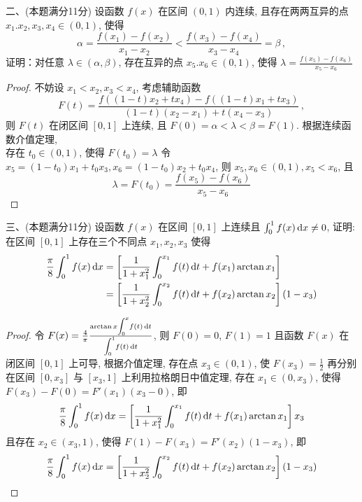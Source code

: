 \documentclass[11pt,twoside]{article} %
\begin{document}
\newpage
二、\;\;(本题满分11分)\;
设函数 $f(x)$ 在区间 $(0,1)$ 内连续, 且存在两两互异的点 $x_1.x_2,x_3,x_4\in(0,1)$, 使得
\[\alpha=\frac{f(x_1)-f(x_2)}{x_1-x_2}<\frac{f(x_3)-f(x_4)}{x_3-x_4}=\beta\,,\]
证明：对任意 $\lambda\in(\alpha,\beta)$, 存在互异的点 $x_5.x_6\in(0,1)$, 使得 $\lambda=\frac{f(x_5)-f(x_6)}{x_5-x_6}$
\begin{proof} 
不妨设 $x_1<x_2,x_3<x_4$, 考虑辅助函数
\[F(t)=\frac{f((1-t)x_2+tx_4)-f((1-t)x_1+tx_3)}{(1-t)(x_2-x_1)+t(x_4-x_3)}\,,\]
则 $F(t)$ 在闭区间 $[0,1]$ 上连续, 且 $F(0)=\alpha<\lambda<\beta=F(1)$. 根据连续函数介值定理,\\
存在 $t_0\in(0,1)$, 使得 $F(t_0)=\lambda$
令 $x_5=(1-t_0)x_1+t_0x_3,x_6=(1-t_0)x_2+t_0x_4$, 则 $x_5,x_6\in(0,1),x_5<x_6$, 且
\[\lambda=F(t_0)=\frac{f(x_5)-f(x_6)}{x_5-x_6}\]
\qedhere\end{proof}


三、(本题满分11分)\;
设函数 $f(x)$ 在区间 $[0,1]$ 上连续且 $\int_0^1f(x)\mathop{}\!\mathrm{d} x\neq0$, 证明: 在区间 $[0,1]$ 上存在三个不同点 $x_1,x_2,x_3$ 使得
\begin{align*}
\frac{\pi}{8}\int_0^1f(x)\mathop{}\!\mathrm{d} x&=\left[\frac{1}{1+x_1^2}\int_0^{x_1}f(t)\mathop{}\!\mathrm{d} t+f(x_1)\arctan x_1\right]\\
&=\left[\frac{1}{1+x_2^2}\int_0^{x_2}f(t)\mathop{}\!\mathrm{d} t+f(x_2)\arctan x_2\right](1-x_3)
\end{align*}
\begin{proof}
令 $F(x)=\frac{4}{\pi}\frac{\arctan x\scaleobj{0.8}{\displaystyle\int_0^x}f(t)\dif t}{\scaleobj{0.8}{\displaystyle\int_0^1}f(t)\dif t}$, 则 $F(0)=0$, $F(1)=1$ 且函数 $F(x)$ 在闭区间 $[0,1]$ 上可导, 根据介值定理, 存在点 $x_3\in(0,1)$, 使 $F(x_3)=\frac{1}{2}$
再分别在区间 $[0,x_3]$ 与 $[x_3,1]$ 上利用拉格朗日中值定理, 存在 $x_1\in(0,x_3)$, 使得 $F(x_3)-F(0)=F'(x_1)(x_3-0)$, 即
\[\frac{\pi}{8}\int_0^1f(x)\mathop{}\!\mathrm{d} x=\left[\frac{1}{1+x_1^2}\int_0^{x_1}f(t)\mathop{}\!\mathrm{d} t+f(x_1)\arctan x_1\right]x_3\]
且存在 $x_2\in(x_3,1)$, 使得 $F(1)-F(x_3)=F'(x_2)(1-x_3)$, 即
\[\frac{\pi}{8}\int_0^1f(x)\mathop{}\!\mathrm{d} x=\left[\frac{1}{1+x_2^2}\int_0^{x_2}f(t)\mathop{}\!\mathrm{d} t+f(x_2)\arctan x_2\right](1-x_3)\]
\qedhere\end{proof}
\end{document}
